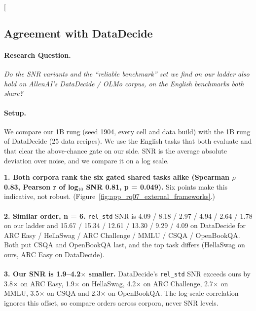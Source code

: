 \clearpage
\twocolumn[{%
\subsection{Agreement with DataDecide}
\label{app:rq07_external_frameworks}

\noindent\begin{minipage}[t]{0.485\textwidth}
\vspace{0pt}
\paragraph{Research Question.} \emph{Do the SNR variants and the ``reliable benchmark'' set we find on our ladder also hold on AllenAI's DataDecide / OLMo corpus, on the English benchmarks both share?}

\paragraph{Setup.} We compare our 1B rung (seed 1904, every cell and data build) with the 1B rung of DataDecide (25 data recipes). We use the English tasks that both evaluate and that clear the above-chance gate on our side. SNR is the average absolute deviation over noise, and we compare it on a log scale.
\end{minipage}\hfill
\begin{minipage}[t]{0.485\textwidth}
\vspace{0pt}
\begin{rqfinding}
\textbf{1. Both corpora rank the six gated shared tasks alike (Spearman $\rho$ 0.83, Pearson r of log$_{10}$ SNR 0.81, p = 0.049).} Six points make this indicative, not robust. (Figure~\ref{fig:app_rq07_external_frameworks}.)
\\
\\
\textbf{2. Similar order, n = 6.} \texttt{rel\_std} SNR is 4.09 / 8.18 / 2.97 / 4.94 / 2.64 / 1.78 on our ladder and 15.67 / 15.34 / 12.61 / 13.30 / 9.29 / 4.09 on DataDecide for ARC Easy / HellaSwag / ARC Challenge / MMLU / CSQA / OpenBookQA. Both put CSQA and OpenBookQA last, and the top task differs (HellaSwag on ours, ARC Easy on DataDecide).
\\
\\
\textbf{3. Our SNR is 1.9--4.2$\times$ smaller.} DataDecide's \texttt{rel\_std} SNR exceeds ours by 3.8$\times$ on ARC Easy, 1.9$\times$ on HellaSwag, 4.2$\times$ on ARC Challenge, 2.7$\times$ on MMLU, 3.5$\times$ on CSQA and 2.3$\times$ on OpenBookQA. The log-scale correlation ignores this offset, so compare orders across corpora, never SNR levels.
\end{rqfinding}
\end{minipage}

}
